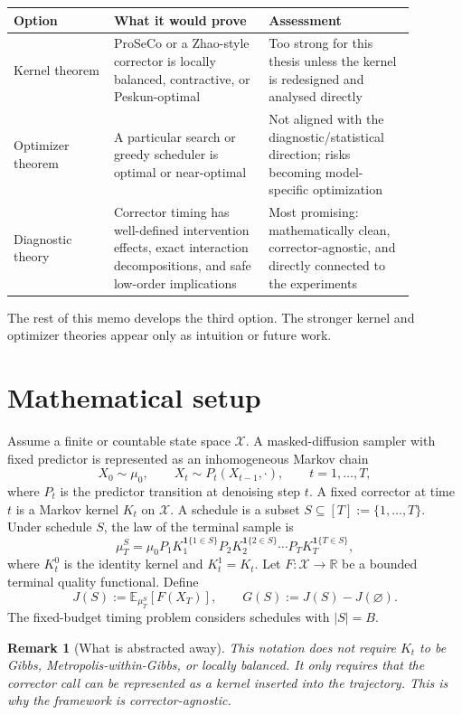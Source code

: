 \documentclass[11pt]{article}
\newtheorem{remark}{Remark}
\newcommand{\calX}{\mathcal X}
\newcommand{\E}{\mathbb E}
\newcommand{\R}{\mathbb R}
\newcommand{\1}{\mathbf 1}
\begin{document}
\begin{center}
\begin{tabular}{p{0.22\linewidth}p{0.34\linewidth}p{0.32\linewidth}}
\toprule
Option & What it would prove & Assessment \\
\midrule
Kernel theorem & ProSeCo or a Zhao-style corrector is locally balanced,
contractive, or Peskun-optimal & Too strong for this thesis unless the kernel
is redesigned and analysed directly \\
Optimizer theorem & A particular search or greedy scheduler is optimal or
near-optimal & Not aligned with the diagnostic/statistical direction; risks
becoming model-specific optimization \\
Diagnostic theory & Corrector timing has well-defined intervention effects,
exact interaction decompositions, and safe low-order implications & Most
promising: mathematically clean, corrector-agnostic, and directly connected to
the experiments \\
\bottomrule
\end{tabular}
\end{center}

The rest of this memo develops the third option.  The stronger kernel and
optimizer theories appear only as intuition or future work.

\section{Mathematical setup}

Assume a finite or countable state space \(\calX\).  A masked-diffusion sampler
with fixed predictor is represented as an inhomogeneous Markov chain
\[
  X_0 \sim \mu_0,\qquad
  X_t \sim P_t(X_{t-1},\cdot), \qquad t=1,\ldots,T,
\]
where \(P_t\) is the predictor transition at denoising step \(t\).  A fixed
corrector at time \(t\) is a Markov kernel \(K_t\) on \(\calX\).  A schedule is
a subset \(S\subseteq [T]:=\{1,\ldots,T\}\).  Under schedule \(S\), the law of
the terminal sample is
\[
  \mu_T^S
  =
  \mu_0 P_1 K_1^{\1\{1\in S\}}
        P_2 K_2^{\1\{2\in S\}}
        \cdots
        P_T K_T^{\1\{T\in S\}},
\]
where \(K_t^0\) is the identity kernel and \(K_t^1=K_t\).  Let
\(F:\calX\to\R\) be a bounded terminal quality functional.  Define
\[
  J(S) := \E_{\mu_T^S}[F(X_T)],
  \qquad
  G(S) := J(S)-J(\varnothing).
\]
The fixed-budget timing problem considers schedules with \(|S|=B\).

\begin{remark}[What is abstracted away]
This notation does not require \(K_t\) to be Gibbs, Metropolis-within-Gibbs, or
locally balanced.  It only requires that the corrector call can be represented
as a kernel inserted into the trajectory.  This is why the framework is
corrector-agnostic.
\end{remark}
\end{document}
